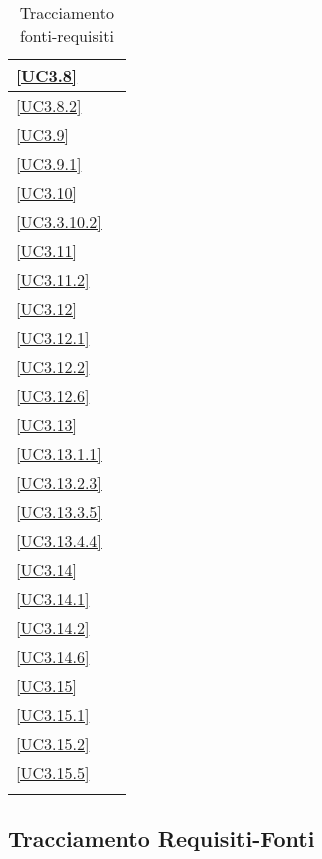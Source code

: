\begin{longtable}{|P{6cm}|P{6cm}|}
	\hline \ref{UC3.8} &  \\
	\hline \ref{UC3.8.2} &  \\
	\hline \ref{UC3.9} &  \\
	\hline \ref{UC3.9.1} &  \\
	\hline \ref{UC3.10} &  \\
	\hline \ref{UC3.3.10.2} &  \\
	\hline \ref{UC3.11} &  \\
	\hline \ref{UC3.11.2} &  \\
	\hline \ref{UC3.12} &  \\
	\hline \ref{UC3.12.1} &  \\
	\hline \ref{UC3.12.2} &  \\
	\hline \ref{UC3.12.6} &  \\
	\hline \ref{UC3.13} &  \\
	\hline \ref{UC3.13.1.1} &  \\
	\hline \ref{UC3.13.2.3} &  \\
	\hline \ref{UC3.13.3.5} &  \\
	\hline \ref{UC3.13.4.4} &  \\
	\hline \ref{UC3.14} &  \\
	\hline \ref{UC3.14.1} &  \\
	\hline \ref{UC3.14.2} &  \\
	\hline \ref{UC3.14.6} &  \\
	\hline \ref{UC3.15} &  \\
	\hline \ref{UC3.15.1} &  \\
	\hline \ref{UC3.15.2} &  \\
	\hline \ref{UC3.15.5} &  \\
	\hline
	\caption{Tracciamento fonti-requisiti}
\end{longtable}

\subsection{Tracciamento Requisiti-Fonti}

